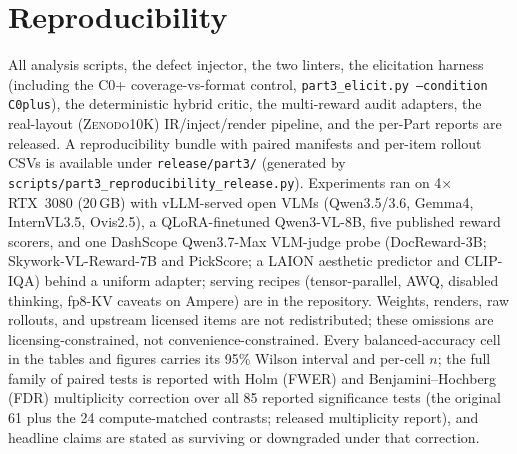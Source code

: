 \documentclass[10pt]{article}
\begin{document}
\section*{Reproducibility}
\small
All analysis scripts, the defect injector, the two linters, the elicitation harness (including the C0+
coverage-vs-format control, \texttt{part3\_elicit.py --condition C0plus}), the deterministic hybrid critic, the
multi-reward audit adapters, the real-layout (\textsc{Zenodo10K}) IR/inject/render pipeline, and the per-Part
reports are released. A reproducibility bundle with paired manifests and per-item rollout CSVs is available
under \texttt{release/part3/} (generated by
\texttt{scripts/part3\_reproducibility\_release.py}). Experiments ran on 4$\times$RTX~3080 (20\,GB) with vLLM-served open VLMs
(Qwen3.5/3.6, Gemma4, InternVL3.5, Ovis2.5), a QLoRA-finetuned Qwen3-VL-8B, five published reward scorers,
and one DashScope Qwen3.7-Max VLM-judge probe
(DocReward-3B; Skywork-VL-Reward-7B and PickScore; a LAION aesthetic predictor and CLIP-IQA) behind a uniform
adapter; serving recipes
(tensor-parallel, AWQ, disabled thinking, fp8-KV caveats on Ampere) are in the repository. Weights, renders,
raw rollouts, and upstream licensed items are not redistributed; these omissions are licensing-constrained,
not convenience-constrained. Every balanced-accuracy cell in the tables and figures carries its 95\%
Wilson interval and per-cell $n$; the full family of paired tests is reported with Holm (FWER) and
Benjamini--Hochberg (FDR) multiplicity correction over all 85 reported significance tests (the original 61
plus the 24 compute-matched contrasts; released multiplicity report), and headline claims are stated as
surviving or downgraded under that correction.
\end{document}
